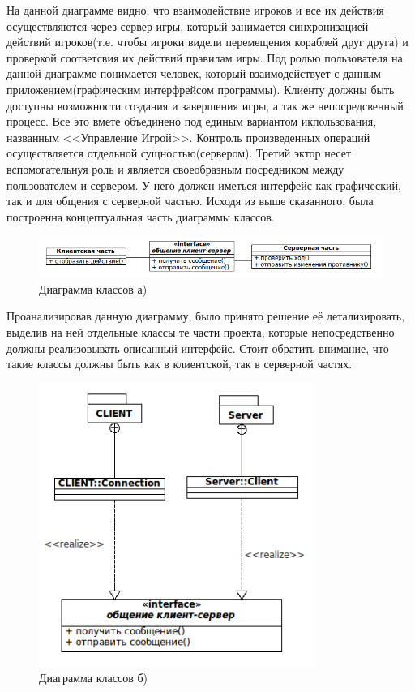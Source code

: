 На данной диаграмме видно, что взаимодействие игроков и все их действия осуществляются через сервер игры, который
занимается синхронизацией действий игроков(т.е. чтобы игроки видели перемещения кораблей друг друга)
и проверкой соответсвия их действий правилам игры. Под ролью пользователя на данной диаграмме понимается 
человек, который взаимодействует с данным приложением(графическим интерфрейсом программы).
Клиенту должны быть доступны возможности создания и завершения игры, а так же непосредсвенный процесс. Все это вмете объединено под единым вариантом икпользования, названным <<Управление Игрой>>. Контроль произведенных операций осуществляется отдельной сущностью(сервером). Третий эктор несет вспомогательнуя роль и является своеобразным посредником между пользователем и сервером. У него должен иметься интерфейс как графический, так и для общения с серверной частью. Исходя из выше сказанного, была построенна концептуальная часть диаграммы классов.

\begin{figure}[h]
\centering
\includegraphics[width=17cm]{images/class.png}
\caption{Диаграмма классов а)}
\label{fig.1}
\end{figure}

Проанализировав данную диаграмму, было принято решение её детализировать, выделив на ней отдельные классы те части проекта, которые непосредственно должны реализовывать описанный интерфейс. Стоит обратить внимание, что такие классы должны быть как в клиентской, так в серверной частях.

\begin{figure}[h]
\centering
\includegraphics[width=9cm]{images/class1.png}
\caption{Диаграмма классов б)}
\label{fig.2}
\end{figure}

\endinput
